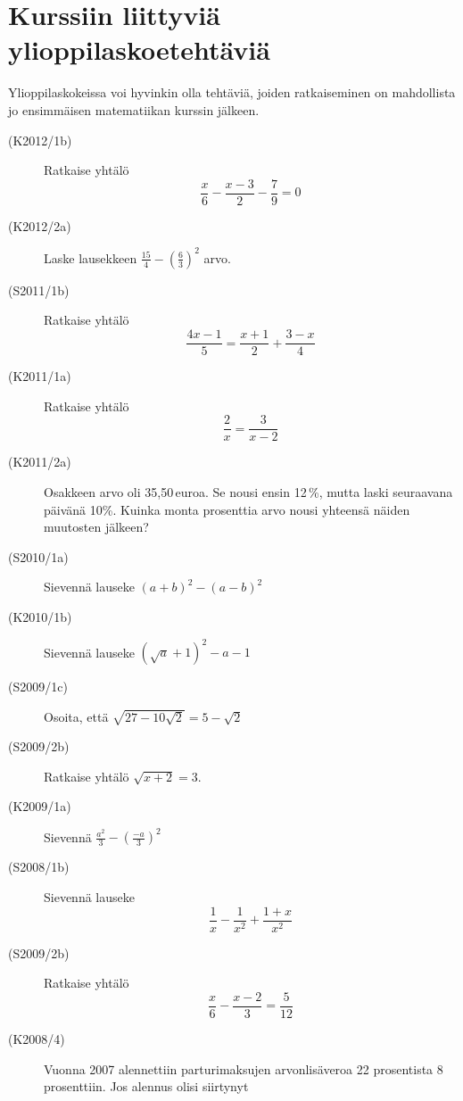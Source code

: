 \chapter{Kurssiin liittyviä ylioppilaskoetehtäviä}

Ylioppilaskokeissa voi hyvinkin olla tehtäviä, joiden ratkaiseminen on mahdollista jo ensimmäisen matematiikan kurssin jälkeen.

\begin{description}

    \item[(K2012/1b)]  Ratkaise yhtälö
                        \[\frac{x}{6} - \frac{x-3}{2} - \frac{7}{9} = 0 \]
    \item[(K2012/2a)]  Laske lausekkeen $ \frac{15}{4} - \left( \frac{6}{3} \right)^2 $ arvo.
    \item[(S2011/1b)]  Ratkaise yhtälö
                        \[ \frac{4x - 1}{5} = \frac{x + 1}{2} + \frac{3 - x}{4} \]
    \item[(K2011/1a)]  Ratkaise yhtälö
                        \[ \frac{2}{x} = \frac{3}{x - 2} \]
    \item[(K2011/2a)]  Osakkeen arvo oli 35,50\,euroa. Se nousi ensin 12\,\%,
                        mutta laski seuraavana päivänä 10\%. Kuinka monta prosenttia
                        arvo nousi yhteensä näiden muutosten jälkeen?
    \item[(S2010/1a)]  Sievennä lauseke $ (a + b)^2 - (a - b)^2 $
    \item[(K2010/1b)]  Sievennä lauseke $ (\sqrt{a} + 1)^2 - a - 1 $
    \item[(S2009/1c)]  Osoita, että $ \sqrt{27 - 10 \sqrt{ 2} } = 5 - \sqrt{2} $
    \item[(S2009/2b)]  Ratkaise yhtälö $ \sqrt{x + 2 } = 3  $.
    \item[(K2009/1a)]  Sievennä $ \frac{a^2}{3} - \left( \frac{-a}{3} \right)^2 $
    \item[(S2008/1b)]  Sievennä lauseke
                        \[ \frac{1}{x} - \frac{1}{x^2} + \frac{1 + x}{x^2} \]
    \item[(S2009/2b)]  Ratkaise yhtälö
                        \[ \frac{x}{6} - \frac{x - 2}{3} = \frac{5}{12} \]
    \item[(K2008/4)]   Vuonna 2007 alennettiin parturimaksujen arvonlisäveroa 22
                        prosentista 8 prosenttiin. Jos alennus olisi siirtynyt

\end{description}
